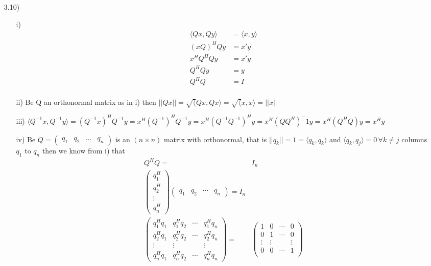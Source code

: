 \documentclass[letterpaper,12pt]{article}
\theoremstyle{definition}
\begin{document}
\begin{enumerate}
\item[3.10)]
\begin{itemize}
\item[i)] \begin{align*}
\langle Qx, Qy\rangle &= \langle x, y\rangle\\
(xQ)^HQy &=  x'y\\
x^HQ^HQy &= x'y\\
Q^HQy &=y\\
Q^HQ&= I\\
\end{align*}
\item[ii)] Be Q an orthonormal matrix as in i) then $ ||Qx|| = \sqrt{\langle} Qx, Qx \rangle  = \sqrt{\langle} x, x \rangle = ||x||$ 
\item[iii)] $\langle Q^{-1}x,Q^{-1}y  \rangle = ( Q^{-1}x)^HQ^{-1}y = x^H(Q^{-1})^HQ^{-1}y =x^H(Q^{-1}Q^{-1})^Hy = x^H(QQ^H)^-1y = x^H(Q^HQ)y=x^Hy  $
\item[iv)] Be $Q = \begin{pmatrix}
q_1 & q_2& ... & q_n\end{pmatrix}$ is an  $(n\times n)$ matrix with orthonormal, that is $ ||q_k|| = 1 = \langle q_k, q_k \rangle$ and $\langle q_k, q_j \rangle =0 \, \forall k \neq j $ columns $q_1$ to $q_n$ then we know from i) that 
\begin{align*}
Q^HQ =& I_n \\
\begin{pmatrix}
q_1^H \\ q_2^H\\ \vdots \\ q_n^H
\end{pmatrix}\begin{pmatrix}
q_1 & q_2&\cdots & q_n\end{pmatrix}=I_n\\
\begin{pmatrix}
q_1^H q_1 & q_1^H q_2 & \cdots& q_1^H q_n \\ 
q_2^H q_1 & q_2^H q_2 & \cdots &q_2^H q_n\\ 
\vdots & \vdots& & \vdots \\
q_n^Hq_1 & q_n^Hq_2& \cdots& q_n^H q_n 
\end{pmatrix} =& \begin{pmatrix}
1&0&\cdots&0\\
0&1&\cdots&0\\
\vdots & \vdots& & \vdots \\
0&0&\cdots&1\\
\end{pmatrix}

\end{align*}
\end{itemize}
\end{enumerate}
\end{document}
